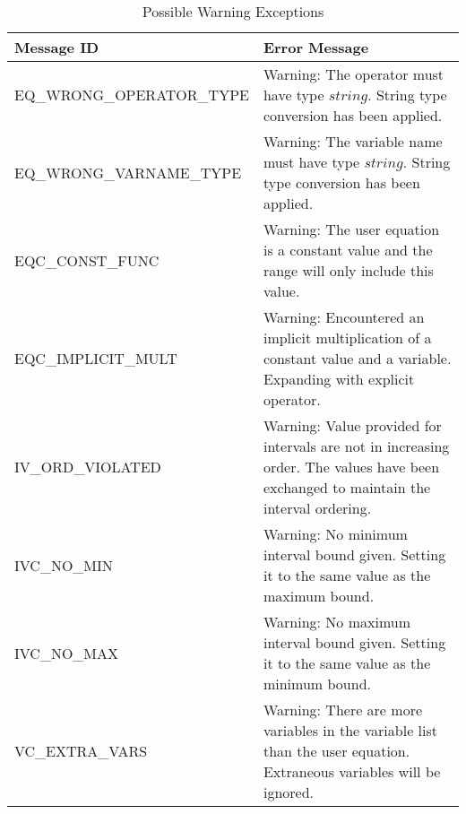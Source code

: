 \documentclass[12pt, titlepage]{article}
\begin{document}
\begin{longtable}{l p{9.5cm}}
	\caption{Possible Warning Exceptions} \\
	\toprule
	\textbf{Message ID} & \textbf{Error Message} \\
	\midrule
	EQ\_WRONG\_OPERATOR\_TYPE & Warning: The operator must have type $string$. 
	String type conversion has been applied.\\
	EQ\_WRONG\_VARNAME\_TYPE & Warning: The variable name must have type 
	$string$. String type conversion has been applied. \\
	EQC\_CONST\_FUNC & Warning: The user equation is a constant value and the 
	range will only include this value.\\
	EQC\_IMPLICIT\_MULT & Warning: Encountered an implicit multiplication of a 
	constant value and a variable. Expanding with explicit operator. \\
	IV\_ORD\_VIOLATED & Warning: Value provided for intervals are not in 
	increasing order. The values have been exchanged to maintain the interval 
	ordering. \\
	IVC\_NO\_MIN & Warning: No minimum interval bound given. Setting it to the 
	same value as the maximum bound. \\
	IVC\_NO\_MAX & Warning: No maximum interval bound given. Setting it to the 
	same value as the minimum bound. \\
	VC\_EXTRA\_VARS & Warning: There are more variables in the variable list 
	than the user equation. Extraneous variables will be ignored. \\
	\bottomrule
\end{longtable}
\end{document}
